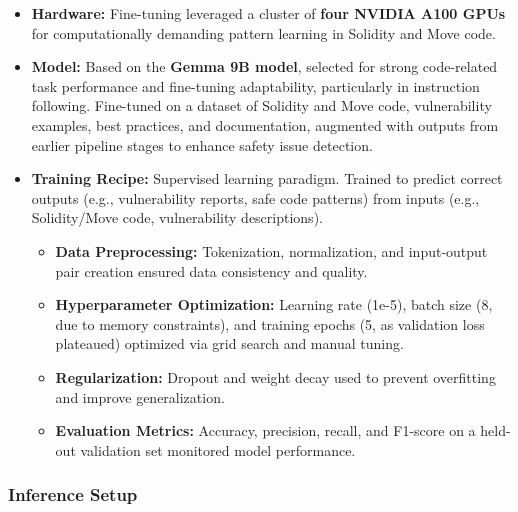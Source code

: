 \begin{itemize}[leftmargin=*]
    \item \textbf{Hardware:} Fine-tuning leveraged a cluster of \textbf{four NVIDIA A100 GPUs} for computationally demanding pattern learning in Solidity and Move code.
    \item \textbf{Model:} Based on the \textbf{Gemma 9B model}, selected for strong code-related task performance and fine-tuning adaptability, particularly in instruction following. Fine-tuned on a dataset of Solidity and Move code, vulnerability examples, best practices, and documentation, augmented with outputs from earlier pipeline stages to enhance safety issue detection.
    \item \textbf{Training Recipe:} Supervised learning paradigm. Trained to predict correct outputs (e.g., vulnerability reports, safe code patterns) from inputs (e.g., Solidity/Move code, vulnerability descriptions).
    \begin{itemize}
        \item \textbf{Data Preprocessing:} Tokenization, normalization, and input-output pair creation ensured data consistency and quality.
        \item \textbf{Hyperparameter Optimization:} Learning rate (1e-5), batch size (8, due to memory constraints), and training epochs (5, as validation loss plateaued) optimized via grid search and manual tuning.
        \item \textbf{Regularization:} Dropout and weight decay used to prevent overfitting and improve generalization.
        \item \textbf{Evaluation Metrics:} Accuracy, precision, recall, and F1-score on a held-out validation set monitored model performance.
    \end{itemize}
\end{itemize}

\subsubsection{Inference Setup}

